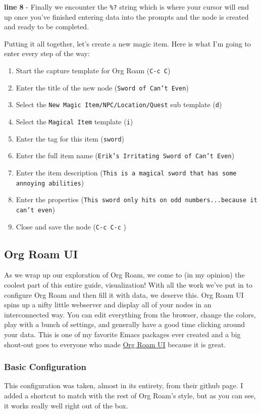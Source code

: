 \documentclass[11pt]{article}
\begin{document}
\textbf{line 8} - Finally we encounter the \texttt{\%?} string which is where your cursor will end up once you've finished entering data into the prompts and the node is created and ready to be completed.

Putting it all together, let's create a new magic item. Here is what I'm going to enter every step of the way:

\begin{enumerate}
\item Start the capture template for Org Roam (\texttt{C-c C})
\item Enter the title of the new node (\texttt{Sword of Can't Even})
\item Select the \texttt{New Magic Item/NPC/Location/Quest} sub template (\texttt{d})
\item Select the \texttt{Magical Item} template (\texttt{i})
\item Enter the tag for this item (\texttt{sword})
\item Enter the full item name (\texttt{Erik's Irritating Sword of Can't Even})
\item Enter the item description (\texttt{This is a magical sword that has some annoying abilities})
\item Enter the properties (\texttt{This sword only hits on odd numbers...because it can't even})
\item Close and save the node (\texttt{C-c C-c} )
\end{enumerate}
\subsection*{Org Roam UI}
\label{sec:org0cf730c}
As we wrap up our exploration of Org Roam, we come to (in my opinion) the coolest part of this entire guide, visualization! With all the work we've put in to configure Org Roam and then fill it with data, we deserve this. Org Roam UI spins up a nifty little webserver and display all of your nodes in an interconnected way. You can edit everything from the browser, change the colors, play with a bunch of settings, and generally have a good time clicking around your data. This is one of my favorite Emacs packages ever created and a big shout-out goes to everyone who made \href{https://github.com/org-roam/org-roam-ui}{Org Roam UI} because it is great.
\subsubsection*{Basic Configuration}
\label{sec:org09ea9c1}
This configuration was taken, almost in its entirety, from their github page. I added a shortcut to match with the rest of Org Roam's style, but as you can see, it works really well right out of the box.
\end{document}
